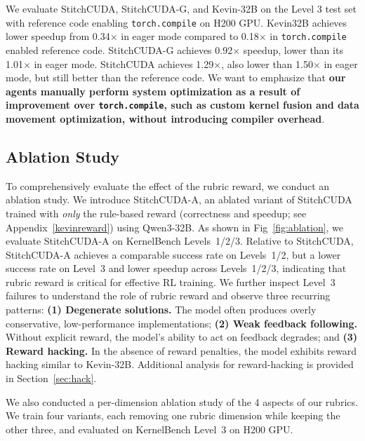 We evaluate StitchCUDA, StitchCUDA-G, and Kevin-32B on the Level 3 test set with reference code enabling \texttt{torch.compile} on H200 GPU. Kevin32B achieves lower speedup from 0.34$\times$ in eager mode compared to 0.18$\times$ in \texttt{torch.compile} enabled reference code. StitchCUDA-G achieves 0.92$\times$ speedup, lower than its 1.01$\times$ in eager mode. StitchCUDA achieves 1.29$\times$, also lower than 1.50$\times$ in eager mode, but still better than the reference code. 
We want to emphasize that \textbf{our agents manually perform system optimization as a result of improvement over \texttt{torch.compile}, such as custom kernel fusion and data movement optimization, without introducing compiler overhead}.



\label{sec:main_result}
\subsection{Ablation Study}
To comprehensively evaluate the effect of the rubric reward, we conduct an ablation study. 
We introduce StitchCUDA-A, an ablated variant of StitchCUDA
trained with \emph{only} the rule-based reward (correctness and speedup; see
Appendix~\ref{kevinreward}) using Qwen3-32B. As shown in Fig~\ref{fig:ablation}, we evaluate StitchCUDA-A
on KernelBench Levels~1/2/3. Relative to StitchCUDA,
StitchCUDA-A achieves a comparable success rate on Levels~1/2, but a
lower success rate on Level~3 and lower speedup across Levels~1/2/3, indicating
that rubric reward is critical for effective RL training. We further inspect
Level~3 failures to understand the role of rubric reward and observe three
recurring patterns: \textbf{(1) Degenerate solutions.} The model often
produces overly conservative, low-performance implementations; \textbf{(2) Weak
feedback following.} Without explicit reward, the model’s ability to act on feedback degrades; and \textbf{(3) Reward hacking.} In the absence of reward penalties, the model exhibits reward hacking similar to Kevin-32B. Additional analysis for reward-hacking is provided in Section~\ref{sec:hack}.

We also conducted a per-dimension ablation study of the 4 aspects of our rubrics. We train four variants, each removing one rubric dimension while keeping the other three, and evaluated on KernelBench Level~3 on H200 GPU. 

